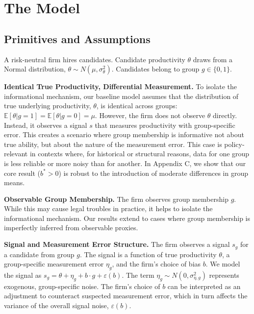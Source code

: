 \section{The Model}

\subsection{Primitives and Assumptions}
A risk-neutral firm hires candidates. Candidate productivity $\theta$ draws from a Normal distribution, $\theta \sim N(\mu, \sigma_\theta^2)$. Candidates belong to group $g \in \{0, 1\}$.

\begin{assumption}[A1]
\textbf{Identical True Productivity, Differential Measurement.} To isolate the informational mechanism, our baseline model assumes that the distribution of true underlying productivity, $\theta$, is identical across groups: $\mathbb{E}[\theta|g=1] = \mathbb{E}[\theta|g=0] = \mu$. However, the firm does not observe $\theta$ directly. Instead, it observes a signal $s$ that measures productivity with group-specific error. This creates a scenario where group membership is informative not about true ability, but about the nature of the measurement error. This case is policy-relevant in contexts where, for historical or structural reasons, data for one group is less reliable or more noisy than for another. In Appendix C, we show that our core result ($b^*>0$) is robust to the introduction of moderate differences in group means.
\end{assumption}

\begin{assumption}[A2]
\textbf{Observable Group Membership.} The firm observes group membership $g$. While this may cause legal troubles in practice, it helps to isolate the informational mechanism. Our results extend to cases where group membership is imperfectly inferred from observable proxies.
\end{assumption}

\begin{assumption}[A3]
\textbf{Signal and Measurement Error Structure.} The firm observes a signal $s_g$ for a candidate from group $g$. The signal is a function of true productivity $\theta$, a group-specific measurement error $\eta_g$, and the firm's choice of bias $b$. We model the signal as $s_g = \theta + \eta_g + b \cdot g + \varepsilon(b)$. The term $\eta_g \sim N(0, \sigma_{\eta,g}^2)$ represents exogenous, group-specific noise. The firm's choice of $b$ can be interpreted as an adjustment to counteract suspected measurement error, which in turn affects the variance of the overall signal noise, $\varepsilon(b)$.
\end{assumption}

